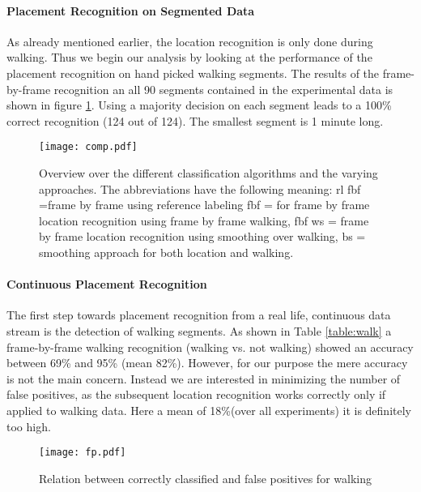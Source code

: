\paragraph{Placement Recognition on Segmented Data}
As already mentioned earlier, the location recognition is only done
during walking. Thus we begin our analysis by looking at the
performance of the placement recognition on  hand picked walking
segments. The results of the frame-by-frame recognition an all 90 segments
contained in the experimental data is shown in figure \ref{fig:comp}.
Using a majority decision on each segment leads to a 100\% correct
recognition (124 out of 124). The smallest segment is 1 minute long.

\begin{figure}[t]
\centering   
\texttt{[image: comp.pdf]}
\caption[Classification overview]{Overview over the different classification algorithms
and the varying approaches. The abbreviations have the following
meaning:   rl fbf =frame by frame using reference labeling
 fbf = for frame by frame location recognition using
frame by frame walking,  fbf ws = frame by frame location
recognition using smoothing over walking,  
bs = smoothing approach for
both location and walking.}
\label{fig:comp}
\end{figure}

\paragraph{Continuous Placement Recognition}
\label{walkingrec}
The first step towards placement recognition from a real life,
continuous  data stream is the detection of walking segments. 
As shown in Table \ref{table:walk} a frame-by-frame walking recognition
(walking vs. not walking) showed an accuracy 
between 69\% and 95\% (mean 82\%).
However, for our purpose the mere accuracy is not the main concern. 
Instead we are interested in minimizing the  number of false
positives, as the subsequent location recognition works correctly only
if applied to walking data. Here a mean of 18\%(over all experiments)
it is definitely too high.
\begin{figure}[t]
\centering   
\texttt{[image: fp.pdf]}
\caption[Relation regarding false positives]{Relation between correctly classified and false positives for walking}
\label{fig:frame}
\end{figure}

